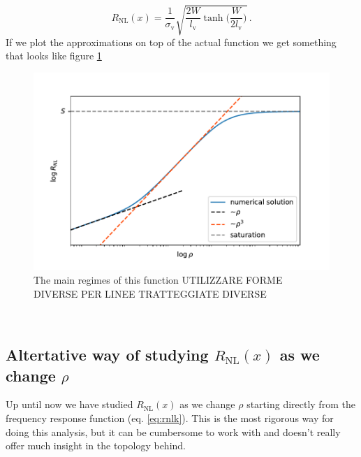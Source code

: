 \[
    R_{\textrm{NL}}(x) = \frac 1{\sigma_{\textrm{v}}}\sqrt{\frac {2W}{l_{\textrm{v}}}\tanh\bigg(\frac W{2l_{\textrm{v}}} \bigg)}\,.
\]
If we plot the approximations on top of the actual function we get something that looks like figure \ref{fig:all_approx_rho}
\begin{figure}[h!]
    \centering
    \includegraphics[width=\linewidth]{Immagini/rnl/all_approx_rho.pdf}
    \caption{The main regimes of this function UTILIZZARE FORME DIVERSE PER LINEE TRATTEGGIATE DIVERSE}
    \label{fig:all_approx_rho}
\end{figure}\\

\subsection{Altertative way of studying $R_{\textrm{NL}}(x)$ as we change $\rho$}
\label{sec:alternaterho}
Up until now we have studied $R_{\textrm{NL}}(x)$ as we change $\rho$ starting directly from the frequency response function (eq. \ref{eq:rnlk}). This is the most rigorous way for doing this analysis, but it can be cumbersome to work with and doesn't really offer much insight in the topology behind.

